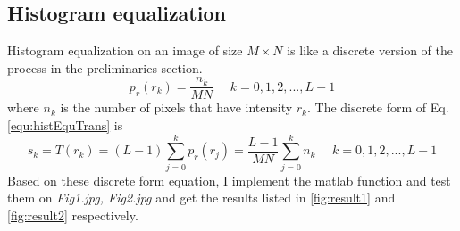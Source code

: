 \subsection{Histogram equalization}
Histogram equalization on an image of size $M\times N$ is like a discrete version of the process in the preliminaries section. \begin{equation} p_r(r_k)=\frac{n_k}{MN} ~~~~~~ k=0,1,2,...,L-1  \end{equation} where $n_k$ is the number of pixels that have intensity $r_k$. The discrete form of Eq.\ref{equ:histEquTrans} is \begin{equation} s_k=T(r_k)=(L-1)\sum_{j=0}^k p_r(r_j)=\frac{L-1}{MN} \sum_{j=0}^k n_k ~~~~~~ k=0,1,2,...,L-1 \end{equation}
Based on these discrete form equation, I implement the matlab function and test them on \emph{Fig1.jpg, Fig2.jpg} and get the results listed in \ref{fig:result1} and \ref{fig:result2} respectively.

